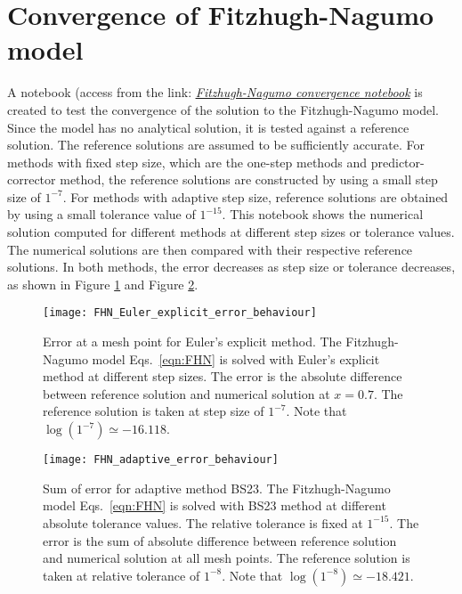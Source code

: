 \section{Convergence of Fitzhugh-Nagumo model}
\label{sec:FHN-convergence}
A notebook (access from the link: \href{https://nbviewer.jupyter.org/github/FarmHJ/numerical-solver/blob/main/examples/fhn_model_convergence.ipynb}{\underline{\emph{Fitzhugh-Nagumo convergence notebook}}} is created to test the convergence of the solution to the Fitzhugh-Nagumo model. Since the model has no analytical solution, it is tested against a reference solution. The reference solutions are assumed to be sufficiently accurate. For methods with fixed step size, which are the one-step methods and predictor-corrector method, the reference solutions are constructed by using a small step size of $1^{-7}$. For methods with adaptive step size, reference solutions are obtained by using a small tolerance value of $1^{-15}$. This notebook shows the numerical solution computed for different methods at different step sizes or tolerance values. The numerical solutions are then compared with their respective reference solutions. In both methods, the error decreases as step size or tolerance decreases, as shown in Figure \ref{fig:Euler_explicit_error} and Figure \ref{fig:adaptive_error}.

\begin{figure}
    \texttt{[image: FHN\_Euler\_explicit\_error\_behaviour]}
    \caption{Error at a mesh point for Euler's explicit method. The Fitzhugh-Nagumo model Eqs.~\eqref{eqn:FHN} is solved with Euler's explicit method at different step sizes. The error is the absolute difference between reference solution and numerical solution at $x=0.7$. The reference solution is taken at step size of $1^{-7}$. Note that $\log(1^{-7})\simeq-16.118$.}
    \label{fig:Euler_explicit_error}
 \end{figure}
\begin{figure}
   \texttt{[image: FHN\_adaptive\_error\_behaviour]}
   \caption{Sum of error for adaptive method BS23. The Fitzhugh-Nagumo model Eqs.~\eqref{eqn:FHN} is solved with BS23 method at different absolute tolerance values. The relative tolerance is fixed at $1^{-15}$. The error is the sum of absolute difference between reference solution and numerical solution at all mesh points. The reference solution is taken at relative tolerance of $1^{-8}$. Note that $\log(1^{-8})\simeq-18.421$.}
   \label{fig:adaptive_error}
\end{figure}